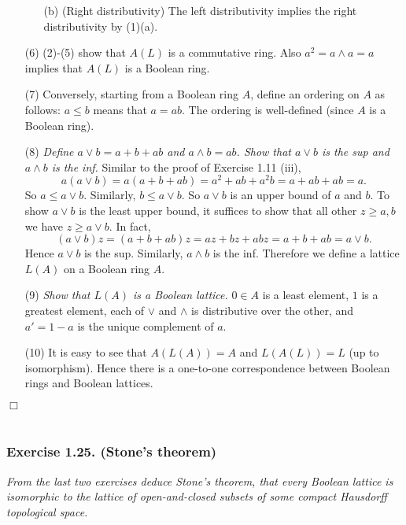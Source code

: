 \documentclass{article}
\begin{document}
\begin{enumerate}
\begin{enumerate}
  \item[(b)]
    (Right distributivity)
    The left distributivity implies the right distributivity by (1)(a).
  \end{enumerate}

\item[(6)]
  (2)-(5) show that $A(L)$ is a commutative ring.
  Also $a^2 = a \wedge a = a$ implies that $A(L)$ is a Boolean ring.

\item[(7)]
  Conversely, starting from a Boolean ring $A$, define an ordering on $A$ as follows:
  $a \leq b$ means that $a = ab$.
  The ordering is well-defined (since $A$ is a Boolean ring).

\item[(8)]
  \emph{Define $a \vee b = a + b + ab$ and $a \wedge b = ab$.
  Show that $a \vee b$ is the sup and $a \wedge b$ is the inf.}
  Similar to the proof of Exercise 1.11 (iii),
  \[
    a(a \vee b) = a(a + b + ab) = a^2 + ab + a^2b = a + ab + ab = a.
  \]
  So $a \leq a \vee b$. Similarly, $b \leq a \vee b$.
  So $a \vee b$ is an upper bound of $a$ and $b$.
  To show $a \vee b$ is the least upper bound, it suffices to show that
  all other $z \geq a, b$ we have $z \geq a \vee b$.
  In fact,
  \[
    (a \vee b)z = (a + b + ab)z = az + bz + abz = a + b + ab = a \vee b.
  \]
  Hence $a \vee b$ is the sup.
  Similarly, $a \wedge b$ is the inf.
  Therefore we define a lattice $L(A)$ on a Boolean ring $A$.

\item[(9)]
  \emph{Show that $L(A)$ is a Boolean lattice.}
  $0 \in A$ is a least element,
  $1$ is a greatest element,
  each of $\vee$ and $\wedge$ is distributive over the other,
  and $a' = 1 - a$ is the unique complement of $a$.

\item[(10)]
  It is easy to see that $A(L(A)) = A$ and $L(A(L)) = L$ (up to isomorphism).
  Hence there is a one-to-one correspondence between Boolean rings and Boolean lattices.
\end{enumerate}
$\Box$ \\\\






\subsubsection*{Exercise 1.25. (Stone's theorem)}
\emph{From the last two exercises deduce Stone's theorem,
that every Boolean lattice is isomorphic to
the lattice of open-and-closed subsets of some compact Hausdorff topological space.} \\
\end{document}

